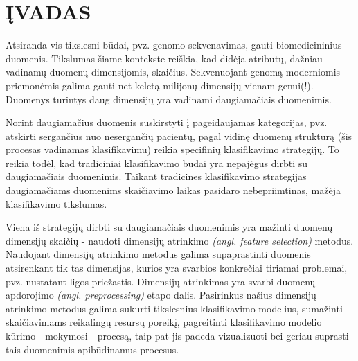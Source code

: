 \newpage
\section*{ĮVADAS}




Atsiranda vis tikslesni būdai, pvz. genomo sekvenavimas, gauti 
biomedicininius duomenis. Tikslumas šiame kontekste reiškia, kad didėja 
atributų, dažniau
vadinamų duomenų dimensijomis, skaičius. Sekvenuojant genomą moderniomis 
priemonėmis galima gauti net keletą milijonų dimensijų vienam genui(!).
Duomenys turintys daug dimensijų yra vadinami daugiamačiais duomenimis.




Norint daugiamačius duomenis suskirstyti į pageidaujamas kategorijas, pvz. 
atskirti sergančius nuo nesergančių pacientų, pagal vidinę duomenų struktūrą 
(šis procesas vadinamas klasifikavimu) reikia specifinių klasifikavimo 
strategijų. To reikia todėl,
kad tradiciniai klasifikavimo būdai yra nepajėgūs dirbti su daugiamačiais
duomenimis. Taikant tradicines klasifikavimo strategijas daugiamačiams 
duomenims skaičiavimo laikas pasidaro nebepriimtinas, mažėja klasifikavimo
tikslumas. 
 


Viena iš strategijų dirbti su daugiamačiais duomenimis yra mažinti duomenų 
dimensijų skaičių - naudoti dimensijų atrinkimo \textit{(angl. feature
selection)}  metodus. Naudojant dimensijų atrinkimo metodus galima 
supaprastinti duomenis atsirenkant tik tas dimensijas, kurios yra svarbios 
konkrečiai tiriamai problemai, pvz. nustatant ligos priežastis. Dimensijų 
atrinkimas yra svarbi duomenų apdorojimo \textit{(angl. preprocessing)} etapo
dalis. Pasirinkus našius dimensijų atrinkimo metodus galima sukurti tikslesnius
klasifikavimo modelius, sumažinti skaičiavimams reikalingų resursų poreikį,
pagreitinti klasifikavimo modelio kūrimo - mokymosi - procesą, taip pat jis 
padeda vizualizuoti bei geriau suprasti tais duomenimis apibūdinamus procesus.

